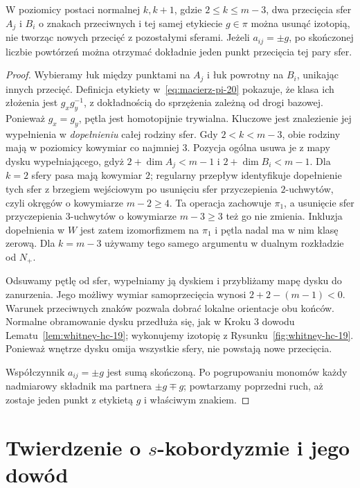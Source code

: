 \begin{lemat}
\label{lem:whitney-pi-20}
W poziomicy postaci normalnej $k,k+1$, gdzie
$2\leq k\leq m-3$, dwa przecięcia sfer
$A_j$ i $B_i$ o znakach przeciwnych i tej samej
etykiecie $g\in\pi$ można usunąć izotopią,
nie tworząc nowych przecięć z pozostałymi sferami.
Jeżeli $a_{ij}=\pm g$, po skończonej liczbie
powtórzeń można otrzymać dokładnie jeden
punkt przecięcia tej pary sfer.
\end{lemat}
\begin{proof}
Wybieramy łuk między punktami na $A_j$ i łuk
powrotny na $B_i$, unikając innych przecięć.
Definicja etykiety w~\eqref{eq:macierz-pi-20}
pokazuje, że klasa ich złożenia jest
$g_xg_y^{-1}$, z dokładnością do sprzężenia
zależną od drogi bazowej. Ponieważ $g_x=g_y$,
pętla jest homotopijnie trywialna. Kluczowe
jest znalezienie jej wypełnienia w
\emph{dopełnieniu} całej rodziny sfer.
Gdy $2<k<m-3$, obie rodziny mają w poziomicy
kowymiar co najmniej $3$. Pozycja ogólna
usuwa je z mapy dysku wypełniającego, gdyż
$2+\dim A_j<m-1$ i $2+\dim B_i<m-1$.
Dla $k=2$ sfery pasa mają kowymiar $2$;
regularny przepływ identyfikuje dopełnienie
tych sfer z brzegiem wejściowym po usunięciu
sfer przyczepienia $2$-uchwytów, czyli
okręgów o kowymiarze $m-2\geq4$.
Ta operacja zachowuje $\pi_1$, a usunięcie
sfer przyczepienia $3$-uchwytów o kowymiarze
$m-3\geq3$ też go nie zmienia.
Inkluzja dopełnienia w $W$ jest zatem
izomorfizmem na $\pi_1$ i pętla nadal
ma w nim klasę zerową. Dla $k=m-3$
używamy tego samego argumentu w dualnym
rozkładzie od $N_+$.

Odsuwamy pętlę od sfer, wypełniamy ją dyskiem
i przybliżamy mapę dysku do zanurzenia.
Jego możliwy wymiar samoprzecięcia wynosi
$2+2-(m-1)<0$. Warunek przeciwnych znaków
pozwala dobrać lokalne orientacje obu końców.
Normalne obramowanie dysku przedłuża się,
jak w Kroku 3 dowodu
Lematu~\ref{lem:whitney-hc-19}; wykonujemy
izotopię z Rysunku~\ref{fig:whitney-hc-19}.
Ponieważ wnętrze dysku omija wszystkie sfery,
nie powstają nowe przecięcia.

Współczynnik $a_{ij}=\pm g$ jest sumą skończoną.
Po pogrupowaniu monomów każdy nadmiarowy
składnik ma partnera $\pm g\mp g$; powtarzamy
poprzedni ruch, aż zostaje jeden punkt
z etykietą $g$ i właściwym znakiem.
\end{proof}

\section{Twierdzenie o \texorpdfstring{$s$}{s}-kobordyzmie i jego dowód}
\label{sec:tw-s-kobordyzm-20}


